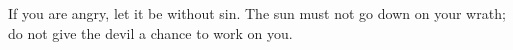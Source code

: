\lettrine[loversize=0.15,lines=2]{I}{}f you are angry, let it be without sin. The sun must not go down on your wrath; do not give the devil a chance to work on you.
